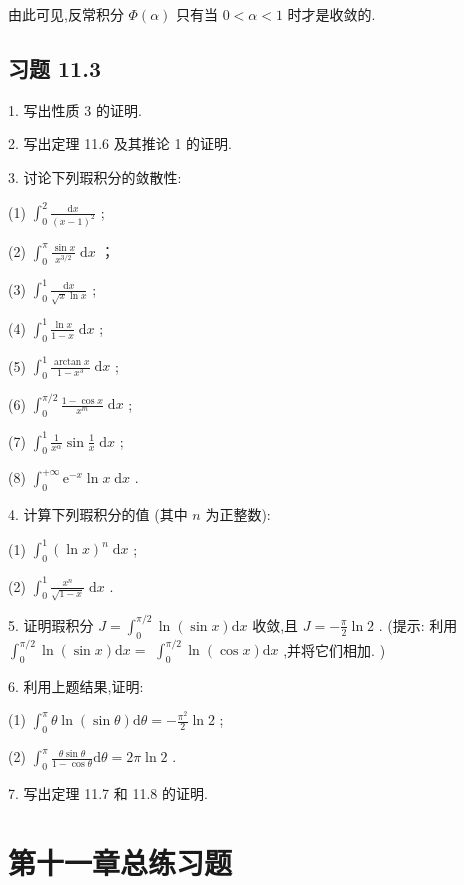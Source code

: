 由此可见,反常积分 \(\Phi \left( \alpha \right)\) 只有当 \(0 < \alpha  < 1\) 时才是收敛的.

\subsection{习题 11.3}

1. 写出性质 3 的证明.

2. 写出定理 11.6 及其推论 1 的证明.

3. 讨论下列瑕积分的敛散性:

(1) \({\int }_{0}^{2}\frac{\mathrm{d}x}{{\left( x - 1\right) }^{2}}\) ;

(2) \({\int }_{0}^{\pi }\frac{\sin x}{{x}^{3/2}}\mathrm{\;d}x\) ；

(3) \({\int }_{0}^{1}\frac{\mathrm{d}x}{\sqrt{x}\ln x}\) ;

(4) \({\int }_{0}^{1}\frac{\ln x}{1 - x}\mathrm{\;d}x\) ;

(5) \({\int }_{0}^{1}\frac{\arctan x}{1 - {x}^{3}}\mathrm{\;d}x\) ;

(6) \({\int }_{0}^{\pi /2}\frac{1 - \cos x}{{x}^{m}}\mathrm{\;d}x\) ;

(7) \({\int }_{0}^{1}\frac{1}{{x}^{\alpha }}\sin \frac{1}{x}\mathrm{\;d}x\) ;

(8) \({\int }_{0}^{+\infty }{\mathrm{e}}^{-x}\ln x\mathrm{\;d}x\) .

4. 计算下列瑕积分的值 (其中 \(n\) 为正整数):

(1) \({\int }_{0}^{1}{\left( \ln x\right) }^{n}\mathrm{\;d}x\) ;

(2) \({\int }_{0}^{1}\frac{{x}^{n}}{\sqrt{1 - x}}\mathrm{\;d}x\) .

5. 证明瑕积分 \(J = {\int }_{0}^{\pi /2}\ln \left( {\sin x}\right) \mathrm{d}x\) 收敛,且 \(J =  - \frac{\pi }{2}\ln 2\) . (提示: 利用 \({\int }_{0}^{\pi /2}\ln \left( {\sin x}\right) \mathrm{d}x =\)  \({\int }_{0}^{\pi /2}\ln \left( {\cos x}\right) \mathrm{d}x\) ,并将它们相加. )

6. 利用上题结果,证明:

(1) \({\int }_{0}^{\pi }\theta \ln \left( {\sin \theta }\right) \mathrm{d}\theta  =  - \frac{{\pi }^{2}}{2}\ln 2\) ;

(2) \({\int }_{0}^{\pi }\frac{\theta \sin \theta }{1 - \cos \theta }\mathrm{d}\theta  = {2\pi }\ln 2\) .

7. 写出定理 11.7 和 11.8 的证明.

\section{第十一章总练习题}

